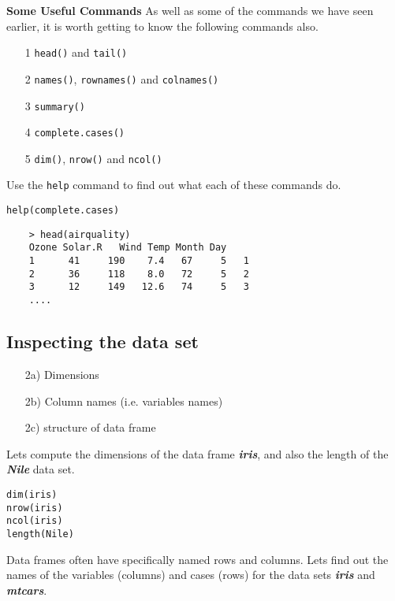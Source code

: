 \documentclass[12pt]{article}
\begin{document}
\textbf{Some Useful Commands}
As well as some of the commands we have seen earlier, it is worth getting to know the following commands also.
\begin{itemize}
\item[1] \texttt{head()} and \texttt{tail()}
\item[2] \texttt{names()}, \texttt{rownames()} and \texttt{colnames()}
\item[3] \texttt{summary()}
\item[4] \texttt{complete.cases()}
\item[5] \texttt{dim()}, \texttt{nrow()} and \texttt{ncol()}
\end{itemize}
Use the \texttt{help} command to find out what each of these commands do.
\begin{framed}
\begin{verbatim}
help(complete.cases)
\end{verbatim}
\end{framed}
\begin{framed}
	\begin{verbatim}
	> head(airquality)
	Ozone Solar.R  	Wind Temp Month Day
	1      41     190    7.4   67     5   1
	2      36     118    8.0   72     5   2
	3      12     149   12.6   74     5   3
	....
	\end{verbatim}
\end{framed}


\newpage
\subsection*{Inspecting the data set}

\begin{itemize}
\item[2a)] Dimensions
\item[2b)] Column names (i.e. variables names)
\item[2c)] structure of data frame
\end{itemize}
Lets compute the dimensions of the data frame \textit{\textbf{iris}}, and also the length of the \textit{\textbf{Nile}} data set.
\begin{framed}
\begin{verbatim}
dim(iris)
nrow(iris)
ncol(iris)
length(Nile)
\end{verbatim}
\end{framed}

Data frames often have specifically named rows and columns. 
Lets find out the names of the variables (columns) and cases (rows) for the data sets \textit{\textbf{iris}} and \textit{\textbf{mtcars}}.
\end{document}
